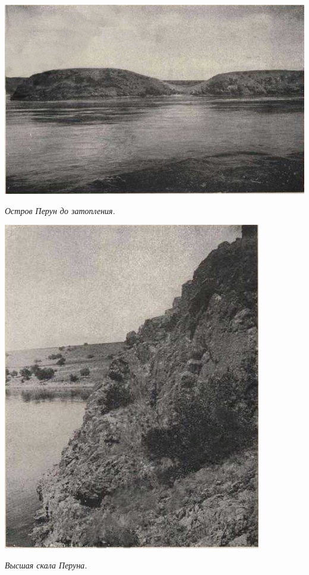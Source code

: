 \begin{center}
\includegraphics[width=\linewidth]{chast-zmiy/ktotakiezmei/per01.jpg}

\textit{Остров Перун до затопления.}
\end{center}
\vspace*{\fill}
\newpage
\vspace*{\fill}
\begin{center}
\includegraphics[width=\linewidth]{chast-zmiy/ktotakiezmei/per02.jpg}

\textit{Высшая скала Перуна.}
\end{center}
\vspace*{\fill}
\newpage

